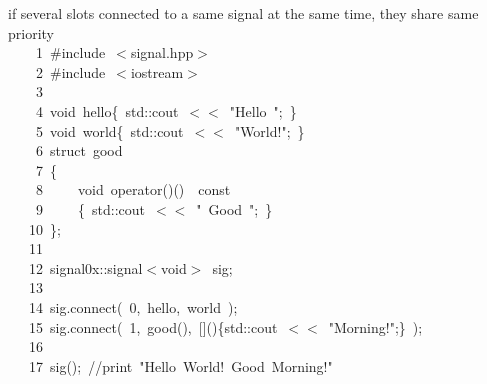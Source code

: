 \documentclass[9pt,onside,a4paper]{article}
\newcommand{\hlstd}[1]{\textcolor[rgb]{0.2,0,0.4}{#1}}
\newcommand{\hlnum}[1]{\textcolor[rgb]{0.2,0.73,0.02}{#1}}
\newcommand{\hlstr}[1]{\textcolor[rgb]{0.09,0.38,0.65}{#1}}
\newcommand{\hlslc}[1]{\textcolor[rgb]{0,0.4,0.2}{#1}}
\newcommand{\hlppc}[1]{\textcolor[rgb]{0.33,0.45,0.69}{#1}}
\newcommand{\hlopt}[1]{\textcolor[rgb]{0.33,0.33,0.33}{#1}}
\newcommand{\hllin}[1]{\textcolor[rgb]{0.6,0.6,0.6}{#1}}
\newcommand{\hlkwb}[1]{\textcolor[rgb]{0.96,0.55,0.14}{#1}}
\newcommand{\hlkwc}[1]{\textcolor[rgb]{0,0,1}{#1}}
\newcommand{\hlkwd}[1]{\textcolor[rgb]{0.82,0.11,0.93}{#1}}
\begin{document}
if several slots connected to a same signal at the same time, they share same priority \\

\noindent
\ttfamily
\hlstd{}\hllin{\ \ \ \ 1\ }\hlppc{\#include\ $<$signal.hpp$>$}\\
\hllin{\ \ \ \ 2\ }\hlstd{}\hlppc{\#include\ $<$iostream$>$}\\
\hllin{\ \ \ \ 3\ }\hlstd{}\\
\hllin{\ \ \ \ 4\ }\hlkwb{void\ }\hlstd{hello}\hlopt{\{\ }\hlstd{std}\hlopt{::}\hlstd{cout\ }\hlopt{$<$$<$\ }\hlstd{}\hlstr{"Hello\ "}\hlstd{}\hlopt{;\ \}}\\
\hllin{\ \ \ \ 5\ }\hlstd{}\hlkwb{void\ }\hlstd{world}\hlopt{\{\ }\hlstd{std}\hlopt{::}\hlstd{cout\ }\hlopt{$<$$<$\ }\hlstd{}\hlstr{"World!"}\hlstd{}\hlopt{;\ \}}\\
\hllin{\ \ \ \ 6\ }\hlstd{}\hlkwb{struct\ }\hlstd{good}\\
\hllin{\ \ \ \ 7\ }\hlopt{\{}\\
\hllin{\ \ \ \ 8\ }\hlstd{}\hlstd{\ \ \ \ }\hlstd{}\hlkwb{void\ }\hlstd{}\hlkwc{operator}\hlstd{}\hlopt{()()}\hlstd{\ \ }\hlopt{}\hlstd{}\hlkwb{const}\\
\hllin{\ \ \ \ 9\ }\hlstd{}\hlstd{\ \ \ \ }\hlstd{}\hlopt{\{\ }\hlstd{std}\hlopt{::}\hlstd{cout\ }\hlopt{$<$$<$\ }\hlstd{}\hlstr{"\ Good\ "}\hlstd{}\hlopt{;\ \}}\\
\hllin{\ \ \ 10\ }\hlstd{}\hlopt{\};}\\
\hllin{\ \ \ 11\ }\hlstd{\\
\hllin{\ \ \ 12\ }signal0x}\hlopt{::}\hlstd{signal}\hlopt{$<$}\hlstd{}\hlkwb{void}\hlstd{}\hlopt{$>$\ }\hlstd{sig}\hlopt{;}\\
\hllin{\ \ \ 13\ }\hlstd{\\
\hllin{\ \ \ 14\ }sig}\hlopt{.}\hlstd{}\hlkwd{connect}\hlstd{}\hlopt{(\ }\hlstd{}\hlnum{0}\hlstd{}\hlopt{,\ }\hlstd{hello}\hlopt{,\ }\hlstd{world\ }\hlopt{);}\\
\hllin{\ \ \ 15\ }\hlstd{sig}\hlopt{.}\hlstd{}\hlkwd{connect}\hlstd{}\hlopt{(\ }\hlstd{}\hlnum{1}\hlstd{}\hlopt{,\ }\hlstd{good}\hlopt{(),\ {[}{]}()\{}\hlstd{std}\hlopt{::}\hlstd{cout\ }\hlopt{$<$$<$\ }\hlstd{}\hlstr{"Morning!"}\hlstd{}\hlopt{;\}\ );}\\
\hllin{\ \ \ 16\ }\hlstd{}\\
\hllin{\ \ \ 17\ }\hlkwd{sig}\hlstd{}\hlopt{();\ }\hlstd{}\hlslc{//print\ "Hello\ World!\ Good\ Morning!"}\hlstd{}\\
\mbox{}
\normalfont
\normalsize
\end{document}
